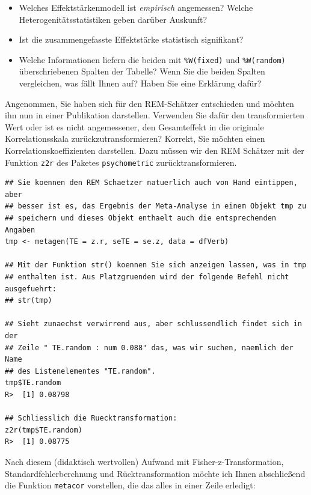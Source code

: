 \documentclass[normalheadings, 10pt]{scrartcl}\usepackage{graphicx, color}
\makeatletter
\newenvironment{kframe}{%
 \def\at@end@of@kframe{}%
 \ifinner\ifhmode%
  \def\at@end@of@kframe{\end{minipage}}%
  \begin{minipage}{\columnwidth}%
 \fi\fi%
 \def\FrameCommand##1{\hskip\@totalleftmargin \hskip-\fboxsep
 \colorbox{shadecolor}{##1}\hskip-\fboxsep
     \hskip-\linewidth \hskip-\@totalleftmargin \hskip\columnwidth}%
 \MakeFramed {\advance\hsize-\width
   \@totalleftmargin\z@ \linewidth\hsize
   \@setminipage}}%
 {\par\unskip\endMakeFramed%
 \at@end@of@kframe}
\newenvironment{knitrout}{}{} %
\newcommand{\code}[1]{\texttt{#1}}
\makeatother
\begin{document}
\begin{itemize}
\item Welches Effektstärkenmodell ist \emph{empirisch} angemessen? Welche
  Heterogenitätsstatistiken geben darüber Auskunft?
\item Ist die zusammengefasste Effektstärke statistisch signifikant?
\item Welche Informationen liefern die beiden mit \code{\%W(fixed)} und
  \code{\%W(random)} überschriebenen Spalten der Tabelle? Wenn Sie die beiden
  Spalten vergleichen, was fällt Ihnen auf? Haben Sie eine Erklärung dafür?
\end{itemize}

Angenommen, Sie haben sich für den REM-Schätzer entschieden und möchten ihn nun
in einer Publikation darstellen. Verwenden Sie dafür den transformierten Wert
oder ist es nicht angemessener, den Gesamteffekt in die originale
Korrelationsskala zurückzutransformieren? Korrekt, Sie möchten einen
Korrelationskoeffizienten darstellen. Dazu müssen wir den REM Schätzer mit der
Funktion \code{z2r} des Paketes \code{psychometric} zurücktransformieren.


\begin{rbsp}
\begin{knitrout}
\color{fgcolor}\begin{kframe}
\begin{verbatim}
## Sie koennen den REM Schaetzer natuerlich auch von Hand eintippen, aber
## besser ist es, das Ergebnis der Meta-Analyse in einem Objekt tmp zu
## speichern und dieses Objekt enthaelt auch die entsprechenden Angaben
tmp <- metagen(TE = z.r, seTE = se.z, data = dfVerb)

## Mit der Funktion str() koennen Sie sich anzeigen lassen, was in tmp
## enthalten ist. Aus Platzgruenden wird der folgende Befehl nicht ausgefuehrt:
## str(tmp)

## Sieht zunaechst verwirrend aus, aber schlussendlich findet sich in der
## Zeile " TE.random : num 0.088" das, was wir suchen, naemlich der Name
## des Listenelementes "TE.random".
tmp$TE.random
R>  [1] 0.08798

## Schliesslich die Ruecktransformation:
z2r(tmp$TE.random)
R>  [1] 0.08775
\end{verbatim}
\end{kframe}
\end{knitrout}

\end{rbsp}

Nach diesem (didaktisch wertvollen) Aufwand mit Fisher-z-Transformation,
Standardfehlerberchnung und Rücktransformation möchte ich Ihnen abschließend die
Funktion \code{metacor} vorstellen, die das alles in einer Zeile erledigt:
\end{document}
